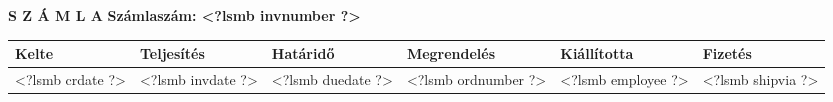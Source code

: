 \documentclass{scrartcl}
\begin{document}
\vspace{0.5cm}

\textbf{\MakeUppercase{S Z Á M L A}}  \hfill \textbf{Számlaszám: <?lsmb invnumber ?>}
\hfill

\vspace{0.5cm}

{\small
\begin{tabularx}{\textwidth}{*{6}{|X}|} \hline
  \textbf{Kelte} & \textbf{Teljesítés} 
      & \textbf{Határidő} & \textbf{Megrendelés}
      & \textbf{Kiállította} 
      & \textbf{Fizetés} \\ [0.5em]
  \hline
  <?lsmb crdate ?> & <?lsmb invdate ?> & <?lsmb duedate ?> & <?lsmb ordnumber ?> & <?lsmb employee ?>
  & <?lsmb shipvia ?> \\
  \hline
\end{tabularx}
}

\vspace{0.2cm}
\end{document}
